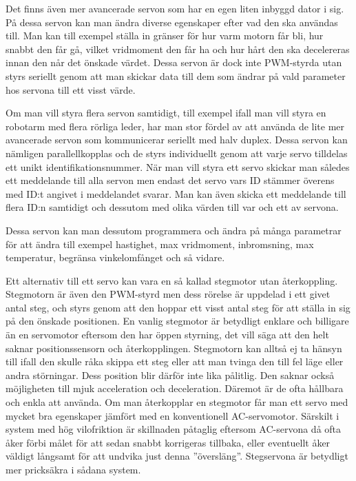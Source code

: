 \documentclass[a4paper,12pt]{article}
\begin{document}
Det finns även mer avancerade servon som har en egen liten inbyggd dator i sig. På dessa servon kan man ändra diverse egenskaper efter vad den ska användas till. Man kan till exempel ställa in gränser för hur varm motorn får bli, hur snabbt den får gå, vilket vridmoment den får ha och hur hårt den ska decelereras innan den når det önskade värdet. Dessa servon är dock inte PWM-styrda utan styrs seriellt genom att man skickar data till dem som ändrar på vald parameter hos servona till ett visst värde. 
 
Om man vill styra flera servon samtidigt, till exempel ifall man vill styra en robotarm med flera rörliga leder, har man stor fördel av att använda de lite mer avancerade servon som kommunicerar seriellt med halv duplex. Dessa servon kan nämligen parallellkopplas och de styrs individuellt genom att varje servo tilldelas ett unikt identifikationsnummer. När man vill styra ett servo skickar man således ett meddelande till alla servon men endast det servo vars ID stämmer överens med ID:t angivet i meddelandet svarar. Man kan även skicka ett meddelande till flera ID:n samtidigt och dessutom med olika värden till var och ett av servona. 
 
Dessa servon kan man dessutom programmera och ändra på många parametrar för att ändra till exempel hastighet, max vridmoment, inbromsning, max temperatur, begränsa vinkelomfånget och så vidare.
 
Ett alternativ till ett servo kan vara en så kallad stegmotor utan återkoppling. Stegmotorn är även den PWM-styrd men dess rörelse är uppdelad i ett givet antal steg, och styrs genom att den hoppar ett visst antal steg för att ställa in sig på den önskade positionen. En vanlig stegmotor är betydligt enklare och billigare än en servomotor eftersom den har öppen styrning, det vill säga att den helt saknar positionssensorn och återkopplingen. Stegmotorn kan alltså ej ta hänsyn till ifall den skulle råka skippa ett steg eller att man tvinga den till fel läge eller andra störningar. Dess position blir därför inte lika pålitlig. Den saknar också möjligheten till mjuk acceleration och deceleration. Däremot är de ofta hållbara och enkla att använda. Om man återkopplar en stegmotor får man ett servo med mycket bra egenskaper jämfört med en konventionell AC-servomotor.  Särskilt i system med hög vilofriktion är skillnaden påtaglig eftersom AC-servona då ofta åker förbi målet för att sedan snabbt korrigeras tillbaka, eller eventuellt åker väldigt långsamt för att undvika just denna ”översläng”. Stegservona är betydligt mer pricksäkra i sådana system. 
 
\end{document}

